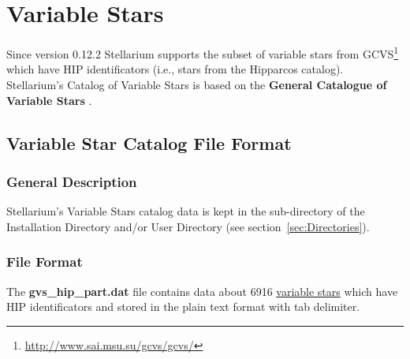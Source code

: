 \section{Variable Stars}
\label{sec:StarCatalogues:VariableStars}

Since version 0.12.2 Stellarium supports the subset of variable stars
from GCVS\footnote{\url{http://www.sai.msu.su/gcvs/gcvs/}} which have  HIP
identificators (i.e., stars from the Hipparcos catalog). Stellarium's Catalog
of Variable Stars is based on the
\textbf{General Catalogue of Variable Stars} \cite{samus}.

\subsection{Variable Star Catalog File Format}
\label{sec:StarCatalogues:VariableStars:format}

\subsubsection{General Description}%
\label{sec:StarCatalogues:VariableStars:general}

Stellarium's Variable Stars catalog data is kept
in the  sub-directory of the Installation Directory and/or
User Directory (see section~\ref{sec:Directories}).


\subsubsection{File Format}%
\label{sec:StarCatalogues:VariableStars:file}

The \textbf{gvs\_hip\_part.dat} file contains data about 6916
\href{Variable_Stars}{variable stars} which have HIP identificators and
stored in the plain text format with tab delimiter.

